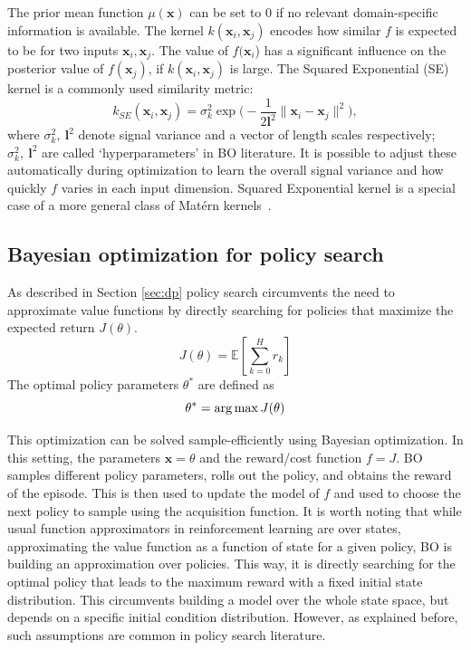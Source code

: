 The prior mean function $\mu(\pmb{x})$ can be set to $0$ if no relevant domain-specific information is available. The kernel $k(\pmb{x}_i, \pmb{x}_j)$ encodes how similar $f$ is expected to be for two inputs $\pmb{x}_i, \pmb{x}_j$. 
The value of $f(\pmb{x}_i$) has a significant influence on the posterior value of $f(\pmb{x}_j)$, if $k(\pmb{x}_i, \pmb{x}_j)$ is large. The Squared Exponential (SE) kernel is a commonly used similarity metric:
\begin{equation}
k_{SE}(\pmb{x}_i, \pmb{x}_j) = \sigma_k^2 \exp\Big(- \frac{1}{2 \pmb{l}^2} \|\pmb{x}_i - \pmb{x}_j\|^2 \Big),
\end{equation}
where $\sigma_k^2, \ \pmb{l}^2$ denote signal variance and a vector of length scales respectively; $\sigma_k^2, \ \pmb{l}^2$ are called `hyperparameters' in BO literature. It is possible to adjust these automatically during optimization to learn the overall signal variance and how quickly $f$ varies in each input dimension. Squared Exponential kernel is a special case of a more general class of Mat\'ern kernels~\citep{stein1999interpolation}.


\subsection{Bayesian optimization for policy search}
 As described in Section \ref{sec:dp} policy search circumvents the need to approximate value functions by directly searching for policies that maximize the expected return $J(\theta)$.
 \begin{equation}
    J(\theta) = \mathds{E}[\sum_{k=0}^H r_k]
\end{equation}
The optimal policy parameters $\theta^*$ are defined as
\begin{equation}
    \theta^* = \operatorname*{arg\,max} J(\theta)
\end{equation}

This optimization can be solved sample-efficiently using Bayesian optimization. In this setting, the parameters $\mathbf{x} = \theta$ and the reward/cost function $f = J$. BO samples different policy parameters, rolls out the policy, and obtains the reward of the episode. This is then used to update the model of $f$ and used to choose the next policy to sample using the acquisition function. It is worth noting that while usual function approximators in reinforcement learning are over states, approximating the value function as a function of state for a given policy, BO is building an approximation over policies. This way, it is directly searching for the optimal policy that leads to the maximum reward with a fixed initial state distribution. This circumvents building a model over the whole state space, but depends on a specific initial condition distribution. However, as explained before, such assumptions are common in policy search literature.


